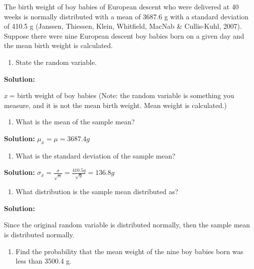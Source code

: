 \documentclass[]{book}
\providecommand{\tightlist}{%
  \setlength{\itemsep}{0pt}\setlength{\parskip}{0pt}}
\begin{document}
The birth weight of boy babies of European descent who were delivered at 40 weeks is normally distributed with a mean of 3687.6 g with a standard deviation of 410.5 g (Janssen, Thiessen, Klein, Whitfield, MacNab \& Cullis-Kuhl, 2007). Suppose there were nine European descent boy babies born on a given day and the mean birth weight is calculated.

\begin{enumerate}
\def\labelenumi{\alph{enumi}.}
\tightlist
\item
  State the random variable.
\end{enumerate}

\textbf{Solution:}

\emph{x} = birth weight of boy babies (Note: the random variable is something you measure, and it is not the mean birth weight. Mean weight is calculated.)

\begin{enumerate}
\def\labelenumi{\alph{enumi}.}
\setcounter{enumi}{1}
\tightlist
\item
  What is the mean of the sample mean?
\end{enumerate}

\textbf{Solution:}
\(\mu_{\bar{x}}=\mu=3687.4g\)

\begin{enumerate}
\def\labelenumi{\alph{enumi}.}
\setcounter{enumi}{2}
\tightlist
\item
  What is the standard deviation of the sample mean?
\end{enumerate}

\textbf{Solution:}
\(\sigma_{\bar{x}}=\frac{\sigma}{\sqrt{n}}=\frac{410.5g}{\sqrt{9}}=136.8g\)

\begin{enumerate}
\def\labelenumi{\alph{enumi}.}
\setcounter{enumi}{3}
\tightlist
\item
  What distribution is the sample mean distributed as?
\end{enumerate}

\textbf{Solution:}

Since the original random variable is distributed normally, then the sample mean is distributed normally.

\begin{enumerate}
\def\labelenumi{\alph{enumi}.}
\setcounter{enumi}{4}
\tightlist
\item
  Find the probability that the mean weight of the nine boy babies born was less than 3500.4 g.
\end{enumerate}
\end{document}
